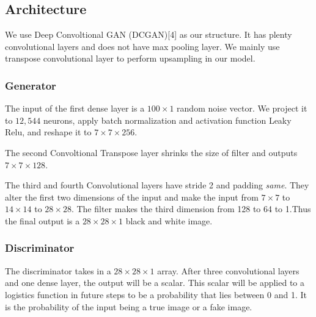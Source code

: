 \documentclass{article}
\begin{document}
\subsection{Architecture}

We use Deep Convoltional GAN (DCGAN)[4] as our structure.
It has plenty convolutional layers and does not have max pooling layer.
We mainly use transpose convolutional layer to perform upsampling in our model.

\subsubsection{Generator}

The input of the first dense layer is a $100\times 1$ random noise vector. 
We project it to $12,544$ neurons, apply batch normalization and activation function Leaky Relu, and reshape it to $7\times 7\times 256$.

The second Convoltional Transpose layer shrinks the size of filter and outputs $7\times 7\times 128$.

The third and fourth Convolutional layers have stride 2 and padding \textit{same}. They alter the first two dimensions of the input and make the input from $7\times 7$ to $14\times 14$ to $28\times 28$.
The filter makes the third dimension from 128 to 64 to 1.Thus the final output is a $28\times 28\times 1$ black and white image.

\subsubsection{Discriminator}

The discriminator takes in a $28\times 28\times 1$ array. After three convolutional layers and one dense layer, the output will be a scalar.
This scalar will be applied to a logistics function in future steps to be a probability that lies between 0 and 1. It is the probability of the input being a true image or a fake image.
\end{document}
